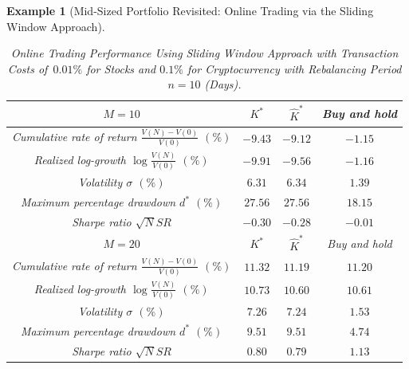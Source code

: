 \documentclass[10pt]{article} %
\newtheorem{example}{Example}[section]
\begin{document}
\begin{example}[Mid-Sized Portfolio Revisited: Online Trading via the Sliding Window Approach]
		\begin{table}[h!] 
			\centering
			\caption{Online Trading Performance Using Sliding Window Approach with Transaction Costs of~$0.01\%$ for Stocks and $0.1\%$ for Cryptocurrency with Rebalancing Period $n=10$ (Days).} 
			\begin{tabular}{|c|c|c|c|}
				\hline
				$M=10$& $K^*$ & $\widehat{K}^*$ & Buy and hold \\
				\hline
				Cumulative rate of return $\frac{V(N)-V(0)}{V(0)}$ $(\%)$ & $-9.43$ & $-9.12$ & $-1.15$ \\
				\hline
				Realized log-growth $\log\frac{V(N)}{V(0)}$ $(\%)$ & $-9.91$ & $-9.56$ & $-1.16$\\
				\hline
				Volatility $\sigma$ $(\%)$ & $6.31$ & $6.34$ & $1.39$\\
				\hline
				Maximum percentage drawdown $d^*$ $(\%)$ & $27.56$ & $27.56$ & $18.15$\\
				\hline
				Sharpe ratio $\sqrt{N}SR$ &  $-0.30$ &  $-0.28$ &  $-0.01$ \\
				\hline
				\hline
				\hline
				$M=20$& $K^*$ & $\widehat{K}^*$ & Buy and hold \\
				\hline
				Cumulative rate of return $\frac{V(N)-V(0)}{V(0)}$ $(\%)$ & $11.32$ & $11.19$ & $11.20$ \\
				\hline
				Realized log-growth $\log\frac{V(N)}{V(0)}$ $(\%)$ & $10.73$ & $10.60$ & $10.61$\\
				\hline
				Volatility $\sigma$ $(\%)$ & $7.26$ & $7.24$ & $1.53$\\
				\hline
				Maximum percentage drawdown $d^*$ $(\%)$ & $9.51$ & $9.51$ & $4.74$\\
				\hline
				Sharpe ratio $\sqrt{N}SR$ &  $0.80$ & $0.79$ & $1.13$ \\
				\hline
				\hline
			\end{tabular}
			\label{table: Descriptive Statistics Daily cost sliding window 0.01 (n=10)}
		\end{table}
		
	\end{example}
	
	
	
\end{document}
